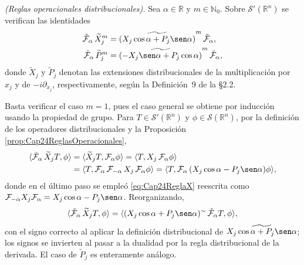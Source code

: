             \begin{proposition}\label{prop:Cap24ReglasDif}
                \textit{(Reglas operacionales distribucionales).} Sea $\alpha \in \mathbb{R}$ y $m\in\mathbb{N}_0$. Sobre $\mathcal{S}'(\mathbb{R}^n)$ se verifican las identidades
                \begin{align}
                    \tilde{\mathcal{F}}_\alpha\,\widetilde{X}_j^m & = \widetilde{\left(X_j\cos\alpha + P_j\sen\alpha\right)}^m\,\tilde{\mathcal{F}}_\alpha, \label{eq:Cap24ReglaXDistr}\\
                    \tilde{\mathcal{F}}_\alpha\,\widetilde{P}_j^m & = \widetilde{\left(-X_j\sen\alpha + P_j\cos\alpha\right)}^m\,\tilde{\mathcal{F}}_\alpha, \label{eq:Cap24ReglaPDistr}
                \end{align}
                donde $\widetilde{X}_j$ y $\widetilde{P}_j$ denotan las extensiones distribucionales de la multiplicación por $x_j$ y de $-i\partial_{x_j}$, respectivamente, según la Definición~9 de la §2.2.
            \end{proposition}
            \begin{Proof}
                Basta verificar el caso $m=1$, pues el caso general se obtiene por inducción usando la propiedad de grupo. Para $T\in \mathcal{S}'(\mathbb{R}^n)$ y $\phi\in \mathcal{S}(\mathbb{R}^n)$, por la definición de los operadores distribucionales y la Proposición \ref{prop:Cap24ReglasOperacionales},
                \begin{align*}
                    \langle \tilde{\mathcal{F}}_\alpha\,\widetilde{X}_j T, \phi\rangle & = \langle \widetilde{X}_j T, \mathcal{F}_\alpha \phi\rangle = \langle T, X_j\,\mathcal{F}_\alpha \phi\rangle \\
                    & = \langle T, \mathcal{F}_\alpha\,\mathcal{F}_{-\alpha}\,X_j\,\mathcal{F}_\alpha \phi\rangle = \langle T, \mathcal{F}_\alpha\,(X_j\cos\alpha - P_j\sen\alpha)\phi\rangle,
                \end{align*}
                donde en el último paso se empleó \eqref{eq:Cap24ReglaX} reescrita como $\mathcal{F}_{-\alpha}X_j\mathcal{F}_\alpha = X_j\cos\alpha - P_j\sen\alpha$. Reorganizando,
                \begin{equation*}
                    \langle \tilde{\mathcal{F}}_\alpha\,\widetilde{X}_j T, \phi\rangle = \langle (X_j\cos\alpha + P_j\sen\alpha)^{\sim}\,\tilde{\mathcal{F}}_\alpha T, \phi\rangle,
                \end{equation*}
                con el signo correcto al aplicar la definición distribucional de $\widetilde{X_j\cos\alpha + P_j\sen\alpha}$; los signos se invierten al pasar a la dualidad por la regla distribucional de la derivada. El caso de $\widetilde{P}_j$ es enteramente análogo.
            \end{Proof}

